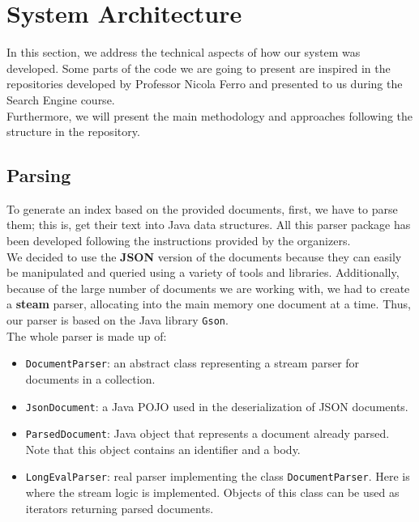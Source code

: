 \section{System Architecture}\label{sec:architecture}
In this section, we address the technical aspects of how our system was developed.
Some parts of the code we are going to present are inspired in the repositories developed by Professor Nicola Ferro and
presented to us during the Search Engine course. \\
Furthermore, we will present the main methodology and approaches following the structure in the repository\cite{jihuming}.

\subsection{Parsing}\label{subsec:parsing}
To generate an index based on the provided documents, first, we have to parse them;
this is, get their text into Java data structures.
All this parser package has been developed following the instructions provided by the organizers.\\
We decided to use the \textbf{JSON} version of the documents because they can easily be manipulated and queried using a
variety of tools and libraries.
Additionally, because of the large number of documents we are working with, we had to create a \textbf{steam} parser,
allocating into the main memory one document at a time.
Thus, our parser is based on the Java library \texttt{Gson}.\\
The whole parser is made up of:
\begin{itemize}
    \item \texttt{DocumentParser}: an abstract class representing a stream parser for documents in a collection.
    \item \texttt{JsonDocument}: a Java POJO used in the deserialization of JSON documents.
    \item \texttt{ParsedDocument}: Java object that represents a document already parsed.
    Note that this object contains an identifier and a body.
    \item \texttt{LongEvalParser}: real parser implementing the class \texttt{DocumentParser}.
    Here is where the stream logic is implemented.
    Objects of this class can be used as iterators returning parsed documents.
\end{itemize}

